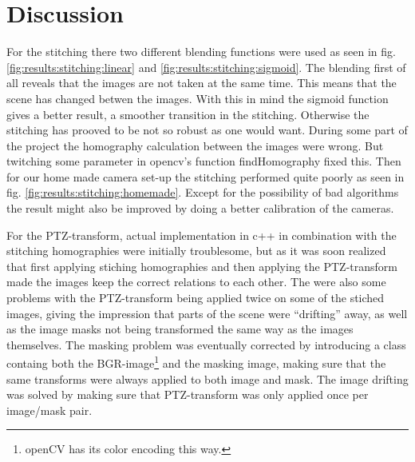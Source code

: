 \section{Discussion}
For the stitching there two different blending functions were used as seen in fig. \ref{fig:results:stitching:linear} and \ref{fig:results:stitching:sigmoid}. The blending first of all reveals that the images are not taken at the same time. This means that the scene has changed betwen the images. With this in mind the sigmoid function gives a better result, a smoother transition in the stitching. Otherwise the stitching has prooved to be not so robust as one would want. During some part of the project the homography calculation between the images were wrong. But twitching some parameter in opencv's function findHomography fixed this. Then for our home made camera set-up the stitching performed quite poorly as seen in fig. \ref{fig:results:stitching:homemade}. Except for the possibility of bad algorithms the result might also be improved by doing a better calibration of the cameras.

For the PTZ-transform, actual implementation in c++ in combination with the stitching homographies were initially troublesome, but as it was soon realized that first applying stiching homographies and then applying the PTZ-transform made the images keep the correct relations to each other. 
The were also some problems with the PTZ-transform being applied twice on some of the stiched images, giving the impression that parts of the scene were ``drifting'' away, as well as the image masks not being transformed the same way as the images themselves.
The masking problem was eventually corrected by introducing a class containg both the BGR-image\footnote{openCV has its color encoding this way.} and the masking image, making sure that the same transforms were always applied to both image and mask. The image drifting was solved by making sure that PTZ-transform was only applied once per image/mask pair. 
